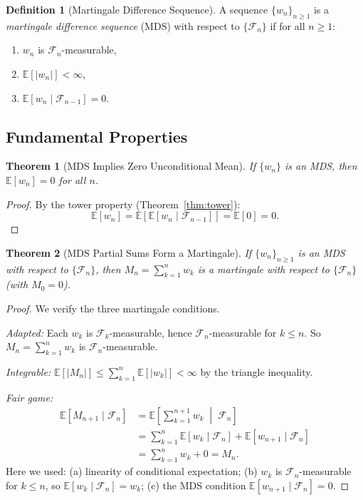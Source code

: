 \documentclass[11pt,a4paper]{article}
\theoremstyle{definition}
\newtheorem{definition}{Definition}[section]
\theoremstyle{plain}
\newtheorem{theorem}{Theorem}[section]
\theoremstyle{remark}
\newcommand{\E}{\mathbb{E}}
\begin{document}
\begin{definition}[Martingale Difference Sequence]
\label{def:mds}
A sequence $\{w_n\}_{n \geq 1}$ is a \emph{martingale difference sequence} (MDS) with respect to $\{\mathcal{F}_n\}$ if for all $n \geq 1$:
\begin{enumerate}[nosep]
    \item $w_n$ is $\mathcal{F}_n$-measurable,
    \item $\E[|w_n|] < \infty$,
    \item $\E[w_n \mid \mathcal{F}_{n-1}] = 0$.
\end{enumerate}
\end{definition}

\subsection{Fundamental Properties}
\label{subsec:mds_props}

\begin{theorem}[MDS Implies Zero Unconditional Mean]
\label{thm:mds_zero_mean}
If $\{w_n\}$ is an MDS, then $\E[w_n] = 0$ for all $n$.
\end{theorem}

\begin{proof}
By the tower property (Theorem~\ref{thm:tower}):
\begin{equation}
    \E[w_n] = \E[\E[w_n \mid \mathcal{F}_{n-1}]] = \E[0] = 0. \label{eq:mds_zero_proof}
\end{equation}
\end{proof}

\begin{theorem}[MDS Partial Sums Form a Martingale]
\label{thm:mds_martingale}
If $\{w_n\}_{n \geq 1}$ is an MDS with respect to $\{\mathcal{F}_n\}$, then $M_n = \sum_{k=1}^n w_k$ is a martingale with respect to $\{\mathcal{F}_n\}$ (with $M_0 = 0$).
\end{theorem}

\begin{proof}
We verify the three martingale conditions.

\textit{Adapted:} Each $w_k$ is $\mathcal{F}_k$-measurable, hence $\mathcal{F}_n$-measurable for $k \leq n$. So $M_n = \sum_{k=1}^n w_k$ is $\mathcal{F}_n$-measurable.

\textit{Integrable:} $\E[|M_n|] \leq \sum_{k=1}^n \E[|w_k|] < \infty$ by the triangle inequality.

\textit{Fair game:}
\begin{align}
    \E[M_{n+1} \mid \mathcal{F}_n]
    &= \E\!\left[\sum_{k=1}^{n+1} w_k \;\middle|\; \mathcal{F}_n\right] \nonumber\\
    &= \sum_{k=1}^n \E[w_k \mid \mathcal{F}_n] + \E[w_{n+1} \mid \mathcal{F}_n] \nonumber\\
    &= \sum_{k=1}^n w_k + 0 = M_n. \label{eq:mds_martingale_proof}
\end{align}
Here we used: (a) linearity of conditional expectation; (b) $w_k$ is $\mathcal{F}_n$-measurable for $k \leq n$, so $\E[w_k \mid \mathcal{F}_n] = w_k$; (c) the MDS condition $\E[w_{n+1} \mid \mathcal{F}_n] = 0$.
\end{proof}
\end{document}
